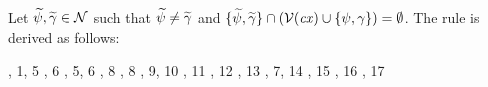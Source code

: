Let $\widetilde{\psi},\widetilde{\gamma}\in\mathcal{N}$ such that $\widetilde{\psi}\neq\widetilde{\gamma}$ and
$\{\widetilde{\psi},\widetilde{\gamma}\}\cap(\mathcal{V}(\mathit{cx})\cup\{\psi,\gamma\})=
\emptyset$. The rule is derived as follows:
\begin{derivation}
\step{\istyO{\typ}}{\hyp}
\step{\isty{\snoc{\cx}{\vdec{\varFXpred}{\tarr{\typ}{\bool}}}}{\typ}}
     {, 1, 5}
\step{\hasty{\snoc{\cx}{\vdec{\varFXpred}{\tarr{\typ}{\bool}}}}
            {\faopO}{\tarr{(\tarr{\typ}{\bool})}{\bool}}}
     {\Refaop, 6}
\step{\cxwf{\snoc{\snoc{\cx}
             {\vdec{\varFXpred}{\tarr{\typ}{\bool}}}}{\vdec{\varFX}{\typ}}}}
     {\Rcxvdec, 5, 6}
\step{\hasty{\snoc{\snoc{\cx}
              {\vdec{\varFXpred}{\tarr{\typ}{\bool}}}}{\vdec{\varFX}{\typ}}}
            {\varFXpred}{\tarr{\typ}{\bool}}}
     {\Revar, 8}
\step{\hasty{\snoc{\snoc{\cx}
              {\vdec{\varFXpred}{\tarr{\typ}{\bool}}}}{\vdec{\varFX}{\typ}}}
            {\varFX}{\typ}}
     {\Revar, 8}
\step{\hasty{\snoc{\snoc{\cx}
              {\vdec{\varFXpred}{\tarr{\typ}{\bool}}}}{\vdec{\varFX}{\typ}}}
            {\app{\varFXpred}{\varFX}}{\bool}}
     {\Reapp, 9, 10}
\step{\hasty{\snoc{\snoc{\cx}
              {\vdec{\varFXpred}{\tarr{\typ}{\bool}}}}{\vdec{\varFX}{\typ}}}
            {\nega{(\app{\varFXpred}{\varFX})}}{\bool}}
     {\Renega, 11}
\step{\hasty{\snoc{\cx}{\vdec{\varFXpred}{\tarr{\typ}{\bool}}}}
            {\abs{\varFX}{\typ}{\nega{(\app{\varFXpred}{\varFX})}}}
            {\tarr{\typ}{\bool}}}
     {\Reabs, 12}
\step{\hasty{\snoc{\cx}{\vdec{\varFXpred}{\tarr{\typ}{\bool}}}}
            {\abs{\varfx}{\typ}{\nega{(\app{\varFXpred}{\varfx})}}}
            {\tarr{\typ}{\bool}}}
     {\Reabsalpha, 13}
\step{\hasty{\snoc{\cx}{\vdec{\varFXpred}{\tarr{\typ}{\bool}}}}
            {\fa{\varfx}{\typ}{\nega{(\app{\varFXpred}{\varfx})}}}
            {\bool}}
     {\Reapp, 7, 14}
\step{\hasty{\snoc{\cx}{\vdec{\varFXpred}{\tarr{\typ}{\bool}}}}
            {\nega{(\fa{\varfx}{\typ}{\nega{(\app{\varFXpred}{\varfx})}})}}
            {\bool}}
     {\Renega, 15}
\step{\hastyO{\abs{\varFXpred}{\tarr{\typ}{\bool}}
                  {\nega{(\fa{\varfx}{\typ}
                             {\nega{(\app{\varFXpred}{\varfx})}})}}}
             {\tarr{(\tarr{\typ}{\bool})}{\bool}}}
     {\Reabs, 16}
\step{\hastyO{\abs{\varfxpred}{\tarr{\typ}{\bool}}
                  {\nega{(\fa{\varfx}{\typ}
                             {\nega{(\app{\varfxpred}{\varfx})}})}}}
             {\tarr{(\tarr{\typ}{\bool})}{\bool}}}
     {\Reabsalpha, 17}
\end{derivation}



